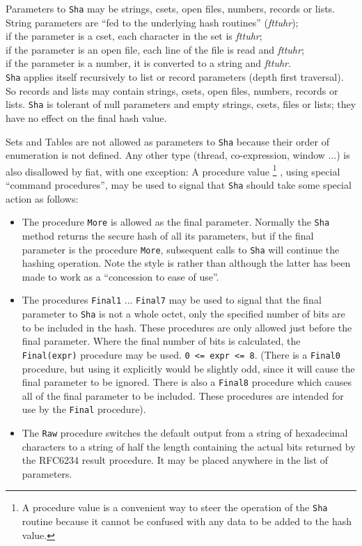 \noindent
Parameters to \texttt{Sha} may be strings, csets, open files, numbers, records or lists.\\
   String parameters are ``fed to the underlying hash routines'' ({\em fttuhr});\\
   if the parameter is a cset, each character in the set is {\em fttuhr\/};\\
   if the parameter is an open file, each line of the file is read and {\em fttuhr\/};\\
   if the parameter is a number, it is converted to a string and {\em fttuhr\/}.\\
\noindent
\texttt{Sha} applies itself recursively to list or record parameters (depth
first traversal). So records and lists may contain strings, csets, open files,
numbers, records or lists. \texttt{Sha} is tolerant of null parameters and empty
strings, csets, files or lists; they have no effect on the final hash value.

Sets and Tables are not allowed as parameters to \texttt{Sha} because their order of
enumeration is not defined. Any other type (thread, co-expression, window ...)
is also disallowed by fiat, with one exception: A procedure value%
\footnote{
A procedure value is a convenient way to steer the operation of the
\texttt{Sha} routine because it cannot be confused with any data to be added to
the hash value.}%
, using special ``command procedures'', may be used to signal that \texttt{Sha}
should take some special action as follows:
\begin{itemize}
  \item
    The procedure \texttt{More} is allowed as the final parameter. Normally the
    \texttt{Sha} method returns the secure hash of all its parameters, but if
    the final parameter is the procedure \texttt{More}, subsequent calls to
    \texttt{Sha} will continue the hashing operation.
    Note the style is
\noindent rather than
\noindent although the latter has been made to work as a ``concession to ease of use''.

\item
  The procedures \texttt{Final1} ... \texttt{Final7} may be used to signal that
  the final parameter to \texttt{Sha} is not a whole octet, only the specified
  number of bits are to be included in the hash. These procedures are only
  allowed just before the final parameter.  Where the final number of bits is
  calculated, the \texttt{Final(expr)} procedure may be
  used. \verb|0 <= expr <= 8|. (There is a \texttt{Final0} procedure, but using
  it explicitly would be slightly odd, since it will cause the final parameter
  to be ignored. There is also a \texttt{Final8} procedure which causes all of
  the final parameter to be included. These procedures are intended for use by
  the \texttt{Final} procedure).

\item
  The \texttt{Raw} procedure switches the default output from a string of
  hexadecimal characters to a string of half the length containing the actual
  bits returned by the RFC6234 result procedure. It may be placed anywhere in
  the list of parameters.
\end{itemize}

